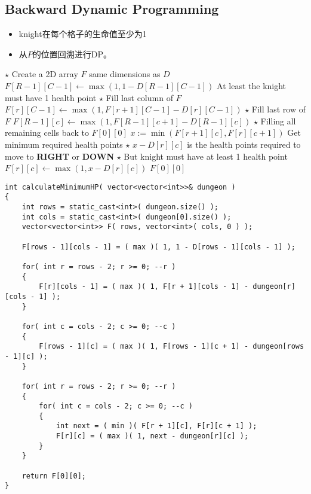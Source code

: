\subsection{Backward Dynamic Programming}
\begin{CJK*}{UTF8}{gbsn}
\begin{itemize}
\item knight在每个格子的生命值至少为1
\item 从$P$的位置回溯进行DP。
\end{itemize}
\end{CJK*}
\setcounter{algorithm}{0}
\begin{algorithm}[H]
\caption{}
\begin{algorithmic}[1]
\State $\star$ Create a 2D array $F$ same dimensions as $D$
\State $F[R-1][C-1] \gets \max(1, 1 - D[R-1][C-1])$ \Comment At least the knight must have 1 health point
\State $\star$ Fill last column of $F$
\State $F[r][C-1]\gets\max(1, F[r+1][C-1] - D[r][C-1])$
\EndFor
\State $\star$ Fill last row of $F$
\State $F[R-1][c]\gets\max(1, F[R-1][c+1] - D[R-1][c])$
\EndFor
\State $\star$ Filling all remaining cells back to $F[0][0]$
\State $x:=\min(F[r+1][c], F[r][c+1])$ \Comment Get minimum required health points
\State $\star$ $x-D[r][c]$ is the health points required to move to \textbf{RIGHT} or \textbf{DOWN}
\State $\star$ But knight must have at least 1 health point
\State $F[r][c]\gets\max(1, x - D[r][c])$ 
\EndFor
\EndFor
\State \Return $F[0][0]$
\EndProcedure
\end{algorithmic}
\end{algorithm}
\setcounter{lstlisting}{0}
\begin{lstlisting}[style=customc, caption={Source Code}]
int calculateMinimumHP( vector<vector<int>>& dungeon )
{
    int rows = static_cast<int>( dungeon.size() );
    int cols = static_cast<int>( dungeon[0].size() );
    vector<vector<int>> F( rows, vector<int>( cols, 0 ) );

    F[rows - 1][cols - 1] = ( max )( 1, 1 - D[rows - 1][cols - 1] );

    for( int r = rows - 2; r >= 0; --r )
    {
        F[r][cols - 1] = ( max )( 1, F[r + 1][cols - 1] - dungeon[r][cols - 1] );
    }

    for( int c = cols - 2; c >= 0; --c )
    {
        F[rows - 1][c] = ( max )( 1, F[rows - 1][c + 1] - dungeon[rows - 1][c] );
    }

    for( int r = rows - 2; r >= 0; --r )
    {
        for( int c = cols - 2; c >= 0; --c )
        {
            int next = ( min )( F[r + 1][c], F[r][c + 1] );
            F[r][c] = ( max )( 1, next - dungeon[r][c] );
        }
    }

    return F[0][0];
}
\end{lstlisting}